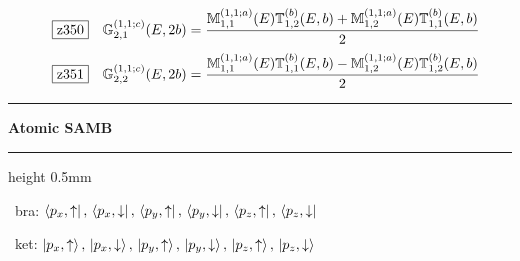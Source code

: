 \documentclass[fleqn,10pt,landscape]{jsarticle}
\begin{document}
\begin{dmath*}
\hspace*{3mm}\fbox{z350}\quad \mathbb{G}_{2,1}^{(1,1;c)}(E,2b)=\frac{\mathbb{M}_{1,1}^{(1,1;a)}(E) \mathbb{T}_{1,2}^{(b)}(E,b) + \mathbb{M}_{1,2}^{(1,1;a)}(E) \mathbb{T}_{1,1}^{(b)}(E,b)}{2}
\end{dmath*}
\begin{dmath*}
\hspace*{3mm}\fbox{z351}\quad \mathbb{G}_{2,2}^{(1,1;c)}(E,2b)=\frac{\mathbb{M}_{1,1}^{(1,1;a)}(E) \mathbb{T}_{1,1}^{(b)}(E,b) - \mathbb{M}_{1,2}^{(1,1;a)}(E) \mathbb{T}_{1,2}^{(b)}(E,b)}{2}
\end{dmath*}
\vspace{5mm}

\vspace{5mm}
\noindent \rule[0.5mm]{5mm}{0.5mm}\hspace{3mm}\textbf{Atomic SAMB}\hspace{3mm}\leaders\hrule height 0.5mm\hfill\kern0pt
\vspace{3mm}

\vspace{5mm}

\noindent\textbullet\, bra: $\bra{p_{x},\uparrow},\, \bra{p_{x},\downarrow},\, \bra{p_{y},\uparrow},\, \bra{p_{y},\downarrow},\, \bra{p_{z},\uparrow},\, \bra{p_{z},\downarrow}$

\noindent\textbullet\, ket: $\ket{p_{x},\uparrow},\, \ket{p_{x},\downarrow},\, \ket{p_{y},\uparrow},\, \ket{p_{y},\downarrow},\, \ket{p_{z},\uparrow},\, \ket{p_{z},\downarrow}$
\end{document}
